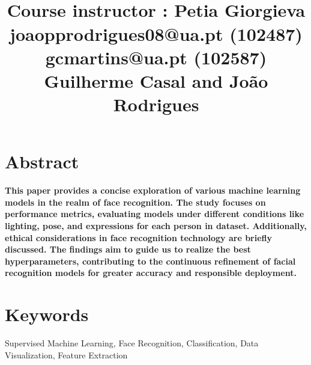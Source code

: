 \documentclass[12pt,a4paper,twocolumn]{article}
\begin{document}
\title{\begin{center}
    \\
    
    \large{Course instructor : Petia Giorgieva} \\
    \small{joaopprodrigues08@ua.pt (102487)\\ gcmartins@ua.pt (102587)}\\
    \large{Guilherme Casal and João Rodrigues}\\
\end{center}} 




\thispagestyle{fancy}
\maketitle

\section{Abstract}
\textbf{This paper provides a concise exploration of various machine learning models in the realm of face recognition. The study focuses on performance metrics, evaluating models under different conditions like lighting, pose, and expressions for each person in dataset. Additionally, ethical considerations in face recognition technology are briefly discussed. The findings aim to guide us to realize the best hyperparameters, contributing to the continuous refinement of facial recognition models for greater accuracy and responsible deployment.} 



\section{Keywords}

Supervised Machine Learning, 
Face Recognition,
Classification,
Data Visualization,
Feature Extraction
\end{document}
